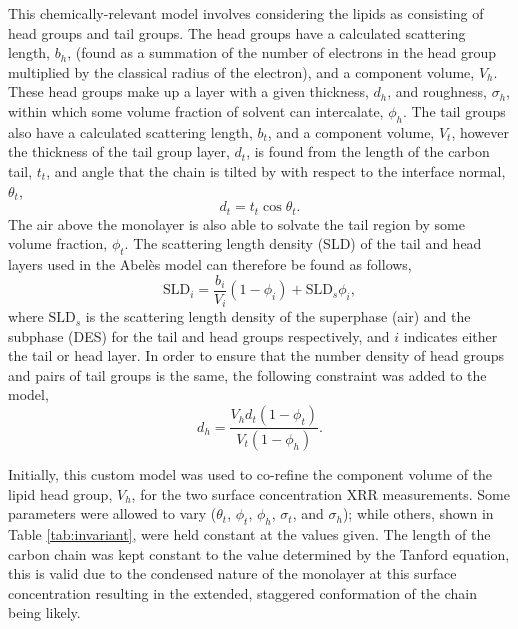 \documentclass[twoside,twocolumn,9pt]{article}
\begin{document}
This chemically-relevant model involves considering the lipids as consisting of head groups and tail groups. The head groups have a calculated scattering length, $b_h$, (found as a summation of the number of electrons in the head group multiplied by the classical radius of the electron), and a component volume, $V_h$. These head groups make up a layer with a given thickness, $d_h$, and roughness, $\sigma_h$, within which some volume fraction of solvent can intercalate, $\phi_h$. The tail groups also have a calculated scattering length, $b_t$, and a component volume, $V_t$, however the thickness of the tail group layer, $d_t$, is found from the length of the carbon tail, $t_t$, and angle that the chain is tilted by with respect to the interface normal, $\theta_t$, 
\begin{equation}
\label{equ:tl}
d_t = t_t \cos{\theta_t}.
\end{equation}
The air above the monolayer is also able to solvate the tail region by some volume fraction, $\phi_t$. The scattering length density (SLD) of the tail and head layers used in the Abel\`{e}s model can therefore be found as follows, 
\begin{equation}
\text{SLD}_i = \frac{b_i}{V_i}(1 - \phi_i) + \text{SLD}_{s}\phi_i,
\end{equation}
where $\text{SLD}_{s}$ is the scattering length density of the superphase (air) and the subphase (DES) for the tail and head groups respectively, and $i$ indicates either the tail or head layer. In order to ensure that the number density of head groups and pairs of tail groups is the same, the following constraint was added to the model,\cite{Braun2017}
\begin{equation}
\label{equ:ht}
d_h = \frac{V_hd_t(1-\phi_t)}{V_t(1-\phi_h)}. 
\end{equation}

Initially, this custom model was used to co-refine the component volume of the lipid head group, $V_h$, for the two surface concentration XRR measurements. Some parameters were allowed to vary ($\theta_t$, $\phi_t$, $\phi_h$, $\sigma_t$, and $\sigma_h$); while others, shown in Table \ref{tab:invariant}, were held constant at the values given. The length of the carbon chain was kept constant to the value determined by the Tanford equation,\cite{Tanford1980} this is valid due to the condensed nature of the monolayer at this surface concentration resulting in the extended, staggered conformation of the chain being likely. 
\end{document}
